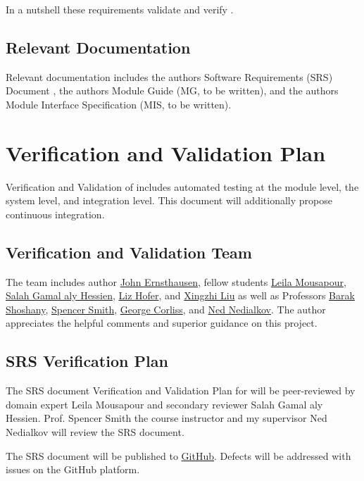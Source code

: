 \documentclass[12pt, titlepage]{article}
\begin{document}
In a nutshell these requirements validate and verify .

\subsection{Relevant Documentation}

Relevant documentation includes the authors Software Requirements (SRS) Document \citep{SRS}, the
authors Module Guide (MG, to be written), and the authors Module Interface Specification (MIS, to be written).

\section{Verification and Validation Plan}

Verification and Validation of  includes automated testing at the module level,
the system level, and integration level. This document will additionally propose continuous integration.

\subsection{Verification and Validation Team}

The  team includes
author
\href{https://github.com/JohnErnsthausen}{John Ernsthausen},
fellow students
\href{https://github.com/LeilaMousapour}{Leila Mousapour},
\href{https://github.com/salahhessien}{Salah Gamal aly Hessien},
\href{https://github.com/liziscool}{Liz Hofer},
and
\href{https://github.com/XingzhiMac}{Xingzhi Liu} as well as Professors
\href{http://baraksh.com}{Barak Shoshany},
\href{https://github.com/smiths}{Spencer Smith},
\href{https://www.cs.mu.edu/~george/}{George Corliss},
and
\href{http://www.cas.mcmaster.ca/~nedialk}{Ned Nedialkov}.
The author appreciates the helpful comments and superior guidance on this project.

\subsection{SRS Verification Plan}

The SRS document Verification and Validation Plan for  will be peer-reviewed by
domain expert Leila Mousapour and secondary reviewer Salah Gamal aly Hessien.
Prof. Spencer Smith the course instructor and my supervisor Ned Nedialkov will review the SRS
document.

The SRS document will be published to \href{https://github.com/JohnErnsthausen/roc}{GitHub}.
Defects will be addressed with issues on the GitHub platform.
\end{document}
